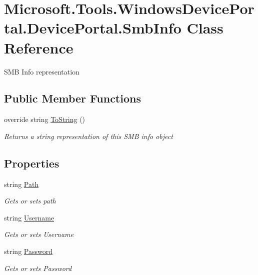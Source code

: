\hypertarget{class_microsoft_1_1_tools_1_1_windows_device_portal_1_1_device_portal_1_1_smb_info}{}\section{Microsoft.\+Tools.\+Windows\+Device\+Portal.\+Device\+Portal.\+Smb\+Info Class Reference}
\label{class_microsoft_1_1_tools_1_1_windows_device_portal_1_1_device_portal_1_1_smb_info}


S\+MB Info representation  


\subsection*{Public Member Functions}
\begin{DoxyCompactItemize}
\item 
override string \hyperlink{class_microsoft_1_1_tools_1_1_windows_device_portal_1_1_device_portal_1_1_smb_info_adf6a9bc57b0dc403406b2f0721c108c9}{To\+String} ()
\begin{DoxyCompactList}\small\item\em Returns a string representation of this S\+MB info object \end{DoxyCompactList}\end{DoxyCompactItemize}
\subsection*{Properties}
\begin{DoxyCompactItemize}
\item 
string \hyperlink{class_microsoft_1_1_tools_1_1_windows_device_portal_1_1_device_portal_1_1_smb_info_ae4a3573df8270c0de37a0176ad224435}{Path}
\begin{DoxyCompactList}\small\item\em Gets or sets path \end{DoxyCompactList}\item 
string \hyperlink{class_microsoft_1_1_tools_1_1_windows_device_portal_1_1_device_portal_1_1_smb_info_a2f73724271afae4c1996b9a56da75296}{Username}
\begin{DoxyCompactList}\small\item\em Gets or sets Username \end{DoxyCompactList}\item 
string \hyperlink{class_microsoft_1_1_tools_1_1_windows_device_portal_1_1_device_portal_1_1_smb_info_a061ed6861646f8f5a5e5e71d42a7ea8d}{Password}
\begin{DoxyCompactList}\small\item\em Gets or sets Password \end{DoxyCompactList}\end{DoxyCompactItemize}


